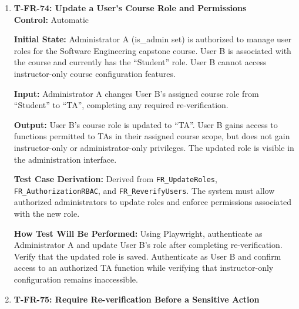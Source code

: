 \documentclass[12pt, titlepage]{article}
\begin{document}
\begin{enumerate}
\textbf{Test Case Derivation:} Derived from \texttt{FR\_AuthorizationRBAC}, which explicitly requires users with undetermined roles to receive no access to course data. If $r(u)$ represents the course role of user $u$, then

\[
r(u)=\mathrm{undefined}
\Rightarrow
\mathrm{CourseAccess}(u)=0.
\]

This verifies that successful authentication alone does not authorize access.

\textbf{How Test Will Be Performed:} Configure an authenticated user without a valid course role. Using Playwright, attempt to access the specified course interfaces and direct record links. Verify that all requests are denied without disclosing course data.

\item \label{T-FR-74}\textbf{T-FR-74: Update a User's Course Role and Permissions}\\

\textbf{Control:} Automatic

\textbf{Initial State:} Administrator A (is\_admin set) is authorized to manage user roles for the Software Engineering capstone course. User B is associated with the course and currently has the ``Student'' role. User B cannot access instructor-only course configuration features.

\textbf{Input:} Administrator A changes User B's assigned course role from ``Student'' to ``TA'', completing any required re-verification.

\textbf{Output:} User B's course role is updated to ``TA''. User B gains access to functions permitted to TAs in their assigned course scope, but does not gain instructor-only or administrator-only privileges. The updated role is visible in the administration interface.

\textbf{Test Case Derivation:} Derived from \texttt{FR\_UpdateRoles}, \texttt{FR\_AuthorizationRBAC}, and \texttt{FR\_ReverifyUsers}. The system must allow authorized administrators to update roles and enforce permissions associated with the new role.

\textbf{How Test Will Be Performed:} Using Playwright, authenticate as Administrator A and update User B's role after completing re-verification. Verify that the updated role is saved. Authenticate as User B and confirm access to an authorized TA function while verifying that instructor-only configuration remains inaccessible.

\item \label{T-FR-75}\textbf{T-FR-75: Require Re-verification Before a Sensitive Action}\\


\end{enumerate}
\end{document}
